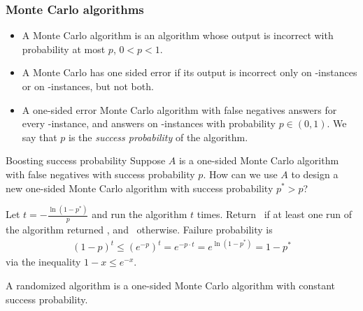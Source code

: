 \begin{frame}[c]\frametitle{Monte Carlo algorithms}

    \begin{definition}
    \begin{itemize}
        \item A \alert{Monte Carlo algorithm} is an algorithm whose output is incorrect with probability at most $p$, $0<p< 1$.
        \item A Monte Carlo has \alert{one sided} error if its output is incorrect only on \Yes-instances or on \No-instances, but not both.
        \item A one-sided error Monte Carlo algorithm with \alert{false negatives} answers \No for every \No-instance, and answers \Yes on \Yes-instances with probability $p\in (0,1)$. We say that $p$ is the \emph{success probability} of the algorithm.
    \end{itemize}
    \end{definition}


\end{frame}

\begin{frame}[c]
    
    \begin{block}{Boosting success probability}
    Suppose $A$ is a one-sided Monte Carlo algorithm with false negatives with success probability $p$. How can we use $A$ to design a new one-sided Monte Carlo algorithm with success probability $p^*>p$?
    \end{block}

    \pause
    Let $t = -\frac{\ln (1-p^*)}{p}$ and run the algorithm $t$ times. Return \Yes\ if at least one run of the algorithm returned \Yes, and \No\ otherwise. \pause Failure probability is
    \begin{align*}
     (1-p)^t \leq (e ^{-p})^t = e^{-p\cdot t}=e^{\ln (1-p^*)}=1 - p^*
    \end{align*}
    via the inequality $1 - x \leq e^{-x}$.
    
    \pause
    \medskip
    \begin{definition}
    	A \alert{randomized algorithm} is a one-sided Monte Carlo algorithm with \alert{constant} success probability.
    \end{definition}

\end{frame}

